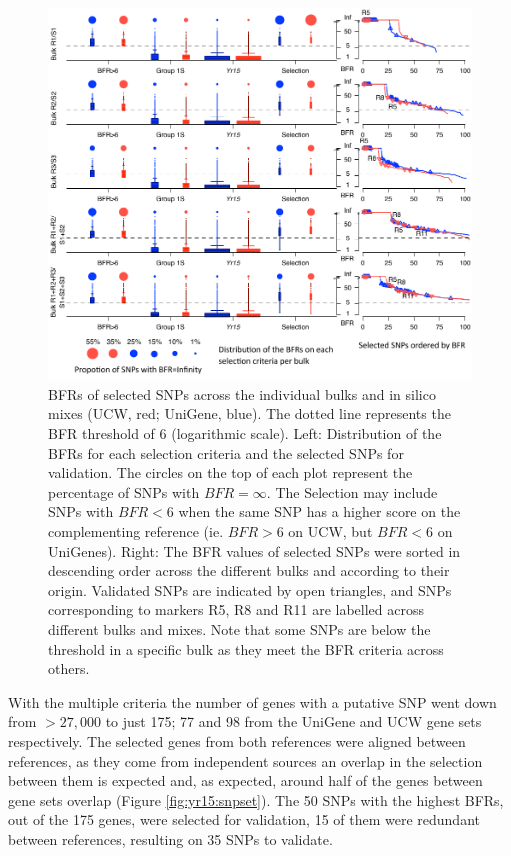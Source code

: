 \begin{figure}
\centering
\includegraphics[width=1\textwidth]{Yr15/Figures/selection/selectionDetals.pdf}
\caption[BFRs of selected SNPs across bulks.]{BFRs of selected SNPs across the individual bulks and in silico mixes (UCW, red; UniGene, blue). The dotted line represents the BFR threshold of 6 (logarithmic scale). Left: Distribution of the BFRs for each selection criteria and the selected SNPs for validation. The circles on the top of each plot represent the percentage of SNPs with $BFR=\infty$. The Selection may include SNPs with $BFR<6$ when the same SNP has a higher score on the complementing reference (ie. $BFR>6$ on UCW, but $BFR<6$ on UniGenes). Right: The BFR values of selected SNPs were sorted in descending order across the different bulks and according to their origin. Validated SNPs are indicated by open triangles, and SNPs corresponding to markers R5, R8 and R11 are labelled across different bulks and mixes. Note that some SNPs are below the threshold in a specific bulk as they meet the BFR criteria across others. }
\label{fig:yr15:bfrDetailScore}
\end{figure}

With the multiple criteria the number of genes with a putative SNP went down from $>27,000$ to just 175; 77 and 98 from the UniGene and UCW gene sets respectively. 
The selected genes from both references were aligned between references, as they come from independent sources an overlap in the selection between them is expected and, as expected, around half of the genes between gene sets overlap (Figure \ref{fig:yr15:snpset}). 
The 50 SNPs with the highest BFRs, out of the 175 genes, were selected for validation, 15 of them were redundant between references, resulting on 35 SNPs to validate. 

